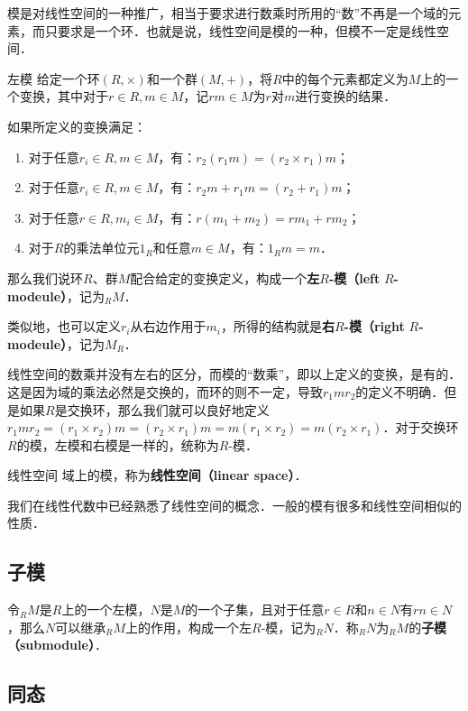 

模是对线性空间的一种推广，相当于要求进行数乘时所用的“数”不再是一个域的元素，而只要求是一个环．也就是说，线性空间是模的一种，但模不一定是线性空间．

\begin{definition}{左模}
给定一个环$(R, \times)$和一个群$(M, +)$，将$R$中的每个元素都定义为$M$上的一个变换，其中对于$r\in R, m\in M$，记$rm\in M$为$r$对$m$进行变换的结果．

如果所定义的变换满足：
\begin{enumerate}
\item 对于任意$r_i\in R, m\in M$，有：$r_2(r_1m)=(r_2\times r_1)m$；
\item 对于任意$r_i\in R, m\in M$，有：$r_2m+r_1m=(r_2+r_1)m$；
\item 对于任意$r\in R, m_i\in M$，有：$r(m_1+m_2)=rm_1+rm_2$；
\item 对于$R$的乘法单位元$1_R$和任意$m\in M$，有：$1_Rm=m$．
\end{enumerate}

那么我们说环$R$、群$M$配合给定的变换定义，构成一个\textbf{左}$R$\textbf{-模（left} $R$\textbf{-modeule）}，记为$_RM$．
\end{definition}

类似地，也可以定义$r_i$从右边作用于$m_i$，所得的结构就是\textbf{右}$R$\textbf{-模（right} $R$\textbf{-modeule）}，记为$M_R$．

线性空间的数乘并没有左右的区分，而模的“数乘”，即以上定义的变换，是有的．这是因为域的乘法必然是交换的，而环的则不一定，导致$r_1mr_2$的定义不明确．但是如果$R$是交换环，那么我们就可以良好地定义$r_1mr_2=(r_1\times r_2)m=(r_2\times r_1)m=m(r_1\times r_2)=m(r_2\times r_1)$．对于交换环$R$的模，左模和右模是一样的，统称为$R$-模．

\begin{definition}{线性空间}
域上的模，称为\textbf{线性空间（linear space）}．
\end{definition}

我们在线性代数中已经熟悉了线性空间的概念．一般的模有很多和线性空间相似的性质．

\subsection{子模}

令$_RM$是$R$上的一个左模，$N$是$M$的一个子集，且对于任意$r\in R$和$n\in N$有$rn\in N$，那么$N$可以继承$_RM$上的作用，构成一个左$R$-模，记为$_RN$．称$_RN$为$_RM$的\textbf{子模（submodule）}．


\subsection{同态}











